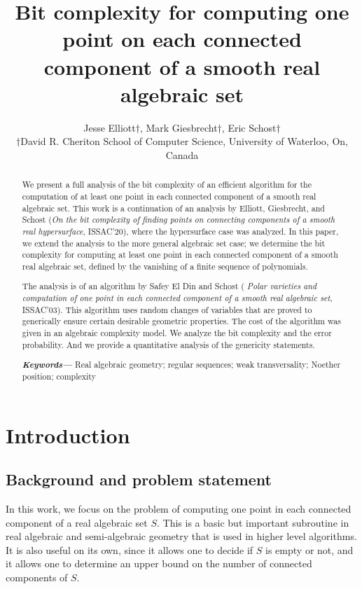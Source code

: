 \documentclass[a4paper]{article}
\title{Bit complexity for computing one point on each connected component of a smooth real algebraic set}
\author{Jesse Elliott$\dagger$, Mark Giesbrecht$\dagger$, Eric Schost$\dagger$  \\
        \small $\dagger$David R. Cheriton School of Computer Science, University of Waterloo, On, Canada \\
}
\date{} %
\providecommand{\keywords}[1]
{
  \small	
  \textbf{\textit{Keywords---}} #1
}
\begin{document}
%
\maketitle
%
\tableofcontents
\newpage
%
%
%
\begin{abstract}
We present a full analysis of the bit complexity of an efficient
  algorithm for the computation of at least one point in each
  connected component of a smooth real algebraic set. This work is a continuation of an analysis by Elliott, Giesbrecht, and Schost ({\em On the bit complexity of finding points on connecting components of a smooth real hypersurface}, ISSAC'20), where the hypersurface case was analyzed. In this paper, we extend the analysis to the more general algebraic set case; we determine the bit complexity for computing at least one point in each connected component of a smooth real algebraic set, defined by the vanishing of a finite sequence of polynomials.  
    
    The analysis is of an algorithm by Safey El Din and Schost ({\em
    Polar varieties and computation of one point in each connected
    component of a smooth real algebraic set}, ISSAC'03). This
  algorithm uses random changes of variables that are proved to
  generically ensure certain desirable geometric properties. The
  cost of the algorithm was given in an algebraic complexity
  model. We analyze the bit complexity and the error probability. And we provide a
  quantitative analysis of the genericity statements. 

\keywords{Real algebraic geometry; regular sequences; weak transversality; Noether position; complexity}
\end{abstract}
%
%
%




\section{Introduction}
\label{sec:overview}

%
\subsection{Background and problem statement}
%
In this work, we focus on the problem of computing one point in each connected component of a real algebraic
set $S$. This is a basic but important subroutine in real algebraic and semi-algebraic
geometry that is used in higher level algorithms. It is also useful on its own, since it allows one to
decide if $S$ is empty or not, and it allows one to determine an upper bound on the number of connected components of $S$.  
\end{document}
